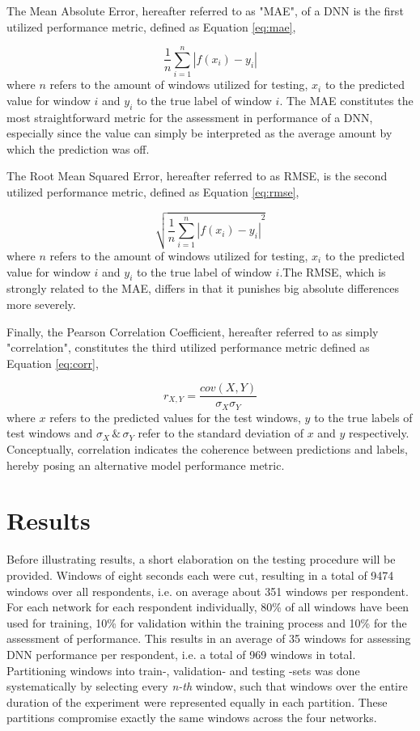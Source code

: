 \documentclass[12pt]{article}
\begin{document}
The Mean Absolute Error, hereafter referred to as "MAE",  of a DNN is the first utilized performance metric, defined as Equation \ref{eq:mae},

\begin{equation}
\label{eq:mae}
\frac{1}{n} \sum^n_{i=1}|f(x_i)-y_i| 
\end{equation}
where $n$ refers to the amount of windows utilized for testing, $x_i$ to the predicted value for window $i$ and $y_i$ to the true label of window $i$.
The MAE constitutes the most straightforward metric for the assessment in performance of a DNN, especially since the value can simply be interpreted as the average amount by which the prediction was off.

The Root Mean Squared Error, hereafter referred to as RMSE, is the second utilized performance metric, defined as Equation \ref{eq:rmse},

\begin{equation}
\label{eq:rmse}
\sqrt{{\frac{1}{n} \sum^n_{i=1}|f(x_i)-y_i|}^2}
\end{equation}
where $n$ refers to the amount of windows utilized for testing, $x_i$ to the predicted value for window $i$ and $y_i$ to the true label of window $i$.The RMSE, which is strongly related to the MAE, differs in that it punishes big absolute differences more severely. 

Finally, the Pearson Correlation Coefficient, hereafter referred to as simply "correlation", constitutes the third utilized performance metric defined as Equation  \ref{eq:corr},

\begin{equation}
\label{eq:corr}
r_{X,Y} = \frac{cov(X,Y)}{\sigma_{X} \sigma_{Y}}
\end{equation}
where $x$ refers to the predicted values for the test windows,  $y$ to the true labels of test windows and $\sigma_{X}\, \& \,\sigma_{Y}$ refer to the standard deviation of $x$ and $y$ respectively.  Conceptually, correlation indicates the coherence between predictions and labels, hereby posing an alternative model performance metric. 

\newpage
\section{Results}
Before illustrating results,  a short elaboration on the testing procedure will be provided.  Windows of eight seconds each were cut, resulting in a total of 9474 windows over all respondents, i.e. on average about 351 windows per respondent. For each network for each respondent individually,  80\% of all windows have been used for training, 10\% for validation within the training process and 10\% for the assessment of performance. This results in an average of 35 windows for assessing DNN performance per respondent, i.e. a total of 969 windows in total.  Partitioning windows into train-, validation- and testing -sets was done systematically by selecting every \textit{n-th} window, such that windows over the entire duration of the experiment were represented equally in each partition.  These partitions compromise exactly the same windows across the four networks. 
\end{document}
